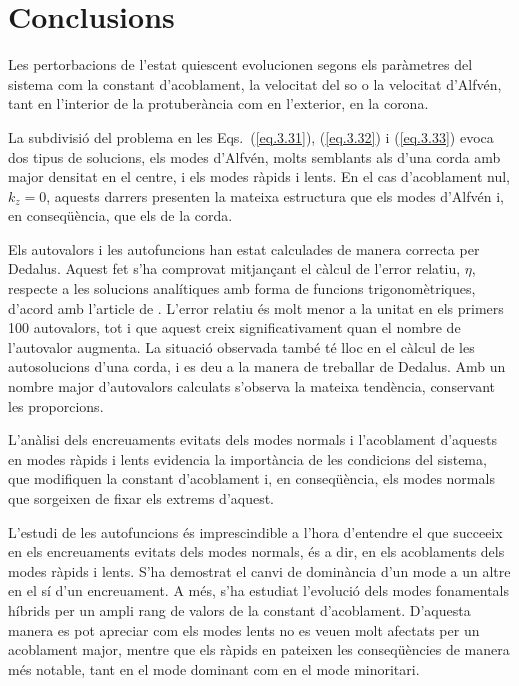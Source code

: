 
\chapter{Conclusions}
Les pertorbacions de l'estat quiescent evolucionen segons els paràmetres del sistema com la constant d'acoblament,
la velocitat del so o la velocitat d'Alfvén, tant en l'interior de la protuberància com en l'exterior, en la corona.

La subdivisió del problema en les Eqs.~(\ref{eq.3.31}), (\ref{eq.3.32}) i (\ref{eq.3.33}) evoca dos tipus de solucions,
els modes d'Alfvén, molts semblants als d'una corda amb major densitat en el centre, i els modes ràpids i lents.
En el cas d'acoblament nul, $k_z = 0$, aquests darrers presenten la mateixa estructura que els modes d'Alfvén i, en conseqüència, que els de la corda.

Els autovalors i les autofuncions han estat calculades de manera correcta per Dedalus.
Aquest fet s'ha comprovat mitjançant el càlcul de l'error relatiu, $\eta$, respecte a les solucions analítiques amb forma de funcions trigonomètriques,
d'acord amb l'article de \textcite{oscillation_modes_II}.
L'error relatiu és molt menor a la unitat en els primers 100 autovalors, tot i que aquest creix significativament quan el nombre de l'autovalor augmenta. 
La situació observada també té lloc en el càlcul de les autosolucions d'una corda, i es deu a la manera de treballar de Dedalus.
Amb un nombre major d'autovalors calculats s'observa la mateixa tendència, conservant les proporcions.

L'anàlisi dels encreuaments evitats dels modes normals i l'acoblament d'aquests en modes ràpids i lents evidencia la importància de les condicions del sistema,
que modifiquen la constant d'acoblament i, en conseqüència, els modes normals que sorgeixen de fixar els extrems d'aquest.

L'estudi de les autofuncions és imprescindible a l'hora d'entendre el que succeeix en els encreuaments evitats dels modes normals,
és a dir, en els acoblaments dels modes ràpids i lents.
S'ha demostrat el canvi de dominància d'un mode a un altre en el sí d'un encreuament.
A més, s'ha estudiat l'evolució dels modes fonamentals híbrids per un ampli rang de valors de la constant d'acoblament.
D'aquesta manera es pot apreciar com els modes lents no es veuen molt afectats per un acoblament major,
mentre que els ràpids en pateixen les conseqüències de manera més notable, tant en el mode dominant com en el mode minoritari.

